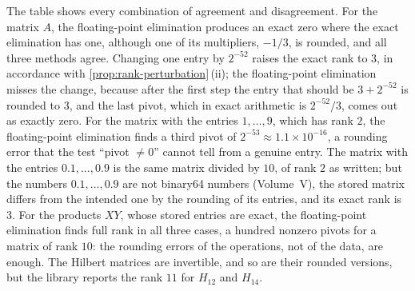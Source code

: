 The table shows every combination of agreement and disagreement. For the matrix $A$, the floating-point elimination produces an exact zero where the exact elimination has one, although one of its multipliers, $-1/3$, is rounded, and all three methods agree. Changing one entry by $2^{-52}$ raises the exact rank to $3$, in accordance with \cref{prop:rank-perturbation}\,(ii); the floating-point elimination misses the change, because after the first step the entry that should be $3+2^{-52}$ is rounded to $3$, and the last pivot, which in exact arithmetic is $2^{-52}/3$, comes out as exactly zero. For the matrix with the entries $1,\ldots,9$, which has rank $2$, the floating-point elimination finds a third pivot of $2^{-53}\approx1.1\times10^{-16}$, a rounding error that the test ``pivot $\ne0$'' cannot tell from a genuine entry. The matrix with the entries $0.1,\ldots,0.9$ is the same matrix divided by $10$, of rank $2$ as written; but the numbers $0.1,\ldots,0.9$ are not binary64 numbers (Volume~V), the stored matrix differs from the intended one by the rounding of its entries, and its exact rank is $3$. For the products $XY$, whose stored entries are exact, the floating-point elimination finds full rank in all three cases, a hundred nonzero pivots for a matrix of rank $10$: the rounding errors of the operations, not of the data, are enough. The Hilbert matrices are invertible, and so are their rounded versions, but the library reports the rank $11$ for $H_{12}$ and $H_{14}$.


